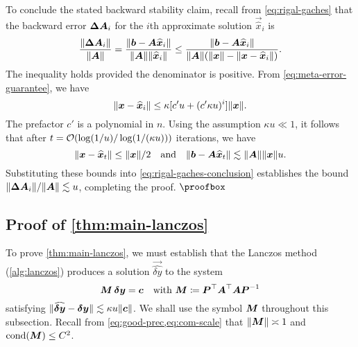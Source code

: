 \documentclass[onefignum,onetabnum,pagebackref,dvipsnames]{siamart220329}
\begin{document}
To conclude the stated backward stability claim, recall from \cref{eq:rigal-gaches} that the backward error $\boldsymbol{\Delta A}_i$ for the $i$th approximate solution $\vec{\hat{x}}_i$ is 
%
\begin{equation} \label{eq:rigal-gaches-conclusion}
    \frac{\norm{\mat{\Delta A}_i}}{\norm{\mat{A}}} = \frac{\norm{\vec{b} - \mat{A}\vec{\hat{x}}_i}}{\norm{\mat{A}}\norm{\vec{\hat{x}}_i}} \le \frac{\norm{\vec{b} - \mat{A}\vec{\hat{x}}_i}}{\norm{\mat{A}}(\norm{\vec{x}} - \norm{\vec{x}-\vec{\hat{x}}_i})}.
\end{equation}
%
The inequality holds provided the denominator is positive.
From \cref{eq:meta-error-guarantee}, we have
%
\begin{equation*}
    \norm{\vec{x}-\vec{\hat{x}}_i} \le \kappa [c'u + (c'\kappa u)^i]\norm{\mat{x}}.
\end{equation*}
%
The prefactor $c'$ is a polynomial in $n$.
Using the assumption $\kappa u \ll 1$, it follows that after $t = \mathcal{O}(\log(1/u)/\log(1/(\kappa u)))$ iterations, we have 
%
\begin{equation*}
    \norm{\vec{x}-\vec{\hat{x}}_t} \le \norm{\vec{x}}/2 \quad \text{and} \quad \norm{\vec{b} - \mat{A}\vec{\hat{x}}_t} \lesssim \norm{\mat{A}}\norm{\vec{x}} u.
\end{equation*}
%
Substituting these bounds into \cref{eq:rigal-gaches-conclusion} establishes the bound $\norm{\mat{\Delta A}_i}/\norm{\mat{A}}\lesssim u$, completing the proof. \hfill $\proofbox$

\subsection{Proof of \cref{thm:main-lanczos}} \label{sec:proof-main-lanczos}

To prove \cref{thm:main-lanczos}, we must establish that the Lanczos method (\cref{alg:lanczos}) produces a solution $\vec{\hat{\delta y}}$ to the system
%
\begin{equation*}
    \boldsymbol{M}\,\boldsymbol{\delta y} = \boldsymbol{c} \quad \text{with } \boldsymbol{M} \coloneqq \boldsymbol{P}^{\-\top}\boldsymbol{A}^\top\boldsymbol{A}\boldsymbol{P}^{-1}
\end{equation*}
%
satisfying $\norm{\smash{\vec{\hat{\delta y}} - \vec{\delta y}}} \lesssim \kappa u \norm{\vec{c}}$.
We shall use the symbol $\boldsymbol{M}$ throughout this subsection.
Recall from \cref{eq:good-prec,eq:com-scale} that $\norm{\mat{M}} \asymp 1$ and $\operatorname{cond}(\boldsymbol{M}) \le C^2$.
\end{document}
